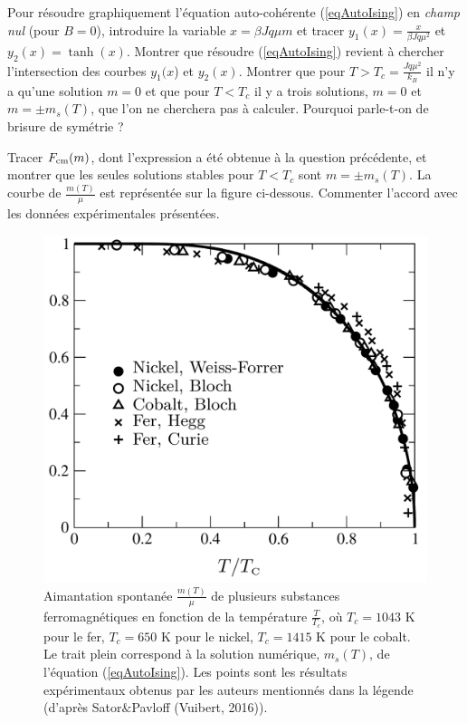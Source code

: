 \documentclass[utf8, 11pt]{feuille}
\begin{document}
\question
Pour résoudre graphiquement l'équation auto-cohérente (\ref{eqAutoIsing}) en {\it champ nul} (pour $B=0$), introduire la variable $x=\beta  J q \mu m$  et tracer $y_1(x)=\frac{x}{\beta  J q \mu^2}$ et $y_2(x)=\tanh (x) $. Montrer que résoudre (\ref{eqAutoIsing}) revient à chercher l'intersection des courbes $y_1(x$) et $y_2(x)$. Montrer que pour $T> T_c =\frac{Jq\mu^2}{k_B}$ il n'y a qu'une solution $m=0$ et que pour $T< T_c$ il y a trois solutions, $m=0$ et $m=\pm m_s(T)$, que l'on ne cherchera pas à calculer.  Pourquoi parle-t-on de brisure de symétrie ?

\question
Tracer $F_{\rm cm}(m)$, dont l'expression a été obtenue à la question précédente, et montrer que les seules solutions stables pour $T<T_c$ sont $m=\pm m_s(T)$.  La courbe de $\frac{m(T)}{\mu}$ est représentée sur la figure ci-dessous. Commenter l'accord avec les données expérimentales présentées.

\begin{figure}[h!]
\centering
\includegraphics[scale=0.6,angle=0]{ising}
\caption{Aimantation spontanée $\frac{m(T)}{\mu}$ de plusieurs substances ferromagnétiques en fonction de la température $\frac{T}{T_c}$, où $T_c=1043$ K pour le fer, $T_c=650$ K pour le nickel, $T_c=1415$ K pour le cobalt. Le trait plein correspond à la solution numérique, $m_s(T)$, de l'équation (\ref{eqAutoIsing}). Les points sont les résultats expérimentaux obtenus par les auteurs mentionnés dans la légende (d'après Sator$\&$Pavloff (Vuibert, 2016)).}
\end{figure}
\end{document}
